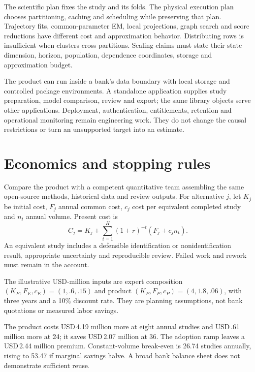 \documentclass[11pt,a4paper,openany]{book}
\begin{document}
The scientific plan fixes the study and its folds. The physical execution
plan chooses partitioning, caching and scheduling while preserving that
plan. Trajectory fits, common-parameter EM, local projections, graph search
and score reductions have different cost and approximation behavior.
Distributing rows is insufficient when clusters cross partitions.
Scaling claims must state their state dimension, horizon, population,
dependence coordinates, storage and approximation budget.

The product can run inside a bank's data boundary with local storage and
controlled package environments. A standalone application supplies
study preparation, model comparison, review and export; the same library
objects serve other applications. Deployment, authentication, entitlements,
retention and operational monitoring remain engineering work. They do not
change the causal restrictions or turn an unsupported target into an estimate.

\chapter{Economics and stopping rules}

Compare the product with a competent quantitative team assembling the same
open-source methods, historical data and review outputs. For alternative
$j$, let $K_j$ be initial cost, $F_j$ annual common cost, $c_j$ cost per
equivalent completed study and $n_t$ annual volume. Present cost is
\[
 C_j=K_j+\sum_{t=1}^H(1+r)^{-t}(F_j+c_jn_t).
\]
An equivalent study includes a defensible identification or
nonidentification result, appropriate uncertainty and reproducible review.
Failed work and rework must remain in the account.

The illustrative USD-million inputs are expert composition
$(K_E,F_E,c_E)=(1,.6,.15)$ and product $(K_P,F_P,c_P)=(4,1.8,.06)$,
with three years and a 10\% discount rate. They are planning assumptions,
not bank quotations or measured labor savings.

\begin{table}[htbp]\centering\small

\caption{Equivalent-output present costs under the stipulated assumptions.
The ramp has annual study volumes 4, 16 and 30.}
\end{table}

The product costs USD\,4.19 million more at eight annual studies and
USD\,.61 million more at 24; it saves USD\,2.07 million at 36.
The adoption ramp leaves a USD\,2.44 million premium. Constant-volume
break-even is 26.74 studies annually, rising to 53.47 if marginal savings
halve. A broad bank balance sheet does not demonstrate sufficient reuse.
\end{document}
